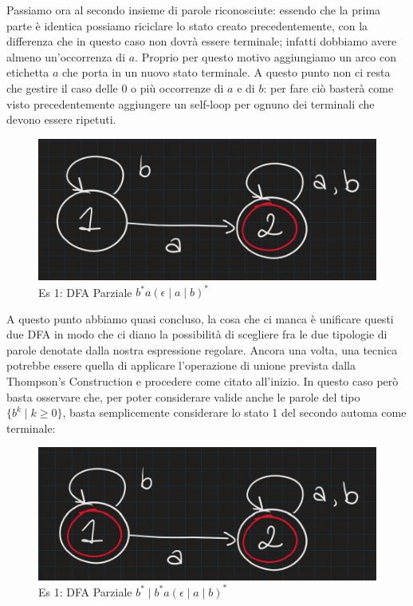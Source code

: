 \documentclass[class=book, crop=false, oneside, 12pt]{standalone}
\begin{document}
Passiamo ora al secondo insieme di parole riconosciute: essendo che la prima parte è identica possiamo riciclare lo stato creato precedentemente, con la differenza che in questo caso non dovrà essere terminale; infatti dobbiamo avere almeno un'occorrenza di \(a\). Proprio per questo motivo aggiungiamo un arco con etichetta \(a\) che porta in un nuovo stato terminale. A questo punto non ci resta che gestire il caso delle 0 o più occorrenze di \(a\) e di \(b\): per fare ciò basterà come visto precedentemente aggiungere un self-loop per ognuno dei terminali che devono essere ripetuti.


\begin{figure}[H]
	\centering
    \includegraphics[width=.6\textwidth]{dfa-pt2-ex3.jpg}
    \caption{Es 1: DFA Parziale \(b^* a (\epsilon \mid a \mid b)^*\)}
    \label{fig:dfa-pt2-ex3}
\end{figure}

A questo punto abbiamo quasi concluso, la cosa che ci manca è unificare questi due DFA in modo che ci diano la possibilità di scegliere fra le due tipologie di parole denotate dalla nostra espressione regolare. Ancora una volta, una tecnica potrebbe essere quella di applicare l'operazione di unione prevista dalla Thompson's Construction e procedere come citato all'inizio. In questo caso però basta osservare che, per poter considerare valide anche le parole del tipo \(\{b^k \mid k \geq 0\}\), basta semplicemente considerare lo stato 1 del secondo automa come terminale: 

\begin{figure}[H]
	\centering
    \includegraphics[width=.6\textwidth]{dfa-pt3-ex3.jpg}
    \caption{Es 1: DFA Parziale \(b^* \mid b^* a (\epsilon \mid a \mid b)^*\)}
    \label{fig:dfa-pt3-ex3}
\end{figure}
\end{document}
